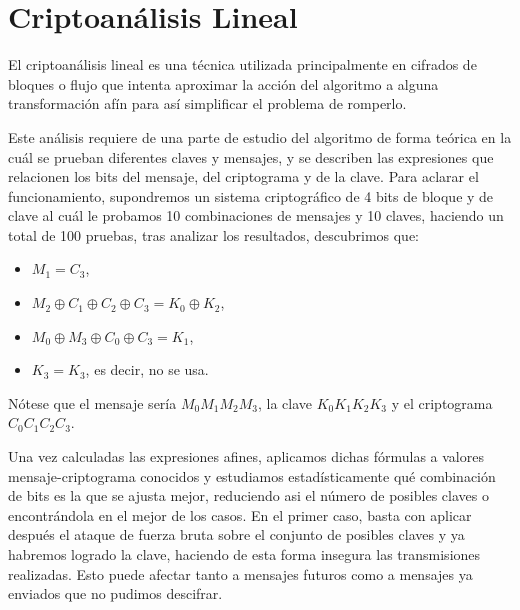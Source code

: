 \section{Criptoanálisis Lineal}
\label{sec:linearcrypto}
El criptoanálisis lineal es una técnica utilizada principalmente en cifrados de bloques o flujo que intenta aproximar la acción del algoritmo a alguna transformación afín para así simplificar el problema de romperlo.

Este análisis requiere de una parte de estudio del algoritmo de forma teórica en la cuál se prueban diferentes claves y mensajes, y se describen las expresiones que relacionen los bits del mensaje, del criptograma y de la clave. Para aclarar el funcionamiento, supondremos un sistema criptográfico de 4 bits de bloque y de clave al cuál le probamos 10 combinaciones de mensajes y 10 claves, haciendo un total de 100 pruebas, tras analizar los resultados, descubrimos que:
\begin{itemize}
	\item $M_1 = C_3$,
	\item $M_2 \oplus C_1 \oplus C_2 \oplus C_3 = K_0 \oplus K_2$,
	\item $M_0 \oplus M_3 \oplus C_0 \oplus C_3 = K_1$,
	\item $K_3 = K_3$, es decir, no se usa.
\end{itemize}

Nótese que el mensaje sería $M_0M_1M_2M_3$, la clave $K_0K_1K_2K_3$ y el criptograma $C_0C_1C_2C_3$.

Una vez calculadas las expresiones afines, aplicamos dichas fórmulas a valores mensaje-criptograma conocidos y estudiamos estadísticamente qué combinación de bits es la que se ajusta mejor, reduciendo asi el número de posibles claves o encontrándola en el mejor de los casos. En el primer caso, basta con aplicar después el ataque de fuerza bruta sobre el conjunto de posibles claves y ya habremos logrado la clave, haciendo de esta forma insegura las transmisiones realizadas. Esto puede afectar tanto a mensajes futuros como a mensajes ya enviados que no pudimos descifrar.

